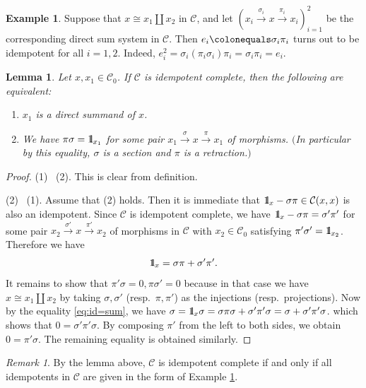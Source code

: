 \documentclass{surv-l}
\numberwithin{equation}{chapter}
\numberwithin{figure}{chapter}
\theoremstyle{plain}
\newtheorem{lem}[thm]{Lemma}
\theoremstyle{definition}
\newtheorem{exm}[thm]{Example}
\theoremstyle{remark}
\newtheorem{rmk}[thm]{Remark}
\newcommand{\id}{1\kern-.25em{\text{{\rm l}}}}
\begin{document}
\begin{exm}\label{exm:split-idemp-from-decomp}
Suppose that $x \cong x_1 \amalg x_2$ in ${\mathcal{C}}$, and let
$(x_i \xrightarrow{\sigma_i} x \xrightarrow{\pi_i} x_i)_{i=1}^2$ be the corresponding direct sum system
in ${\mathcal{C}}$.
Then $e_i\colonequals  \sigma_i \pi_i$ turns out to be idempotent for all $i=1,2$.
Indeed, $e_i^2 = \sigma_i (\pi_i\sigma_i) \pi_i = \sigma_i \pi_i = e_i$.
\end{exm}

\begin{lem}\label{lem:2.5.19}
Let $x, x_1 \in {\mathcal{C}}_0$.
If ${\mathcal{C}}$ is idempotent complete, then the following are equivalent:
\begin{enumerate}
\item
$x_1$ is a direct summand of $x$.
\item
We have $\pi\sigma = \id _{x_1}$ for some pair $x_1 \xrightarrow{\sigma} x \xrightarrow{\pi} x_1$
of morphisms.
$($In particular by this equality, $\sigma$ is a section and
$\pi$ is a retraction.$)$
\end{enumerate}
\end{lem}

\begin{proof}
(1) \text{$\Rightarrow$}\  (2).
This is clear from definition.

(2) \text{$\Rightarrow$}\  (1).
Assume that (2) holds.
Then it is immediate that $\id_x - \sigma\pi \in {\mathcal{C}}(x,x)$ is also an idempotent.
Since ${\mathcal{C}}$ is idempotent complete,
we have $\id_x - \sigma\pi = \sigma'\pi'$ for some pair $x_2 \xrightarrow{\sigma'} x \xrightarrow{\pi'} x_2$
of morphisms in ${\mathcal{C}}$ with $x_2 \in {\mathcal{C}}_0$ satisfying
$\pi'\sigma' = \id_{x_2}$.
Therefore we have
\begin{equation}\label{eq:id=sum}
\id_x = \sigma\pi + \sigma'\pi'.
\end{equation}
It remains to show that $\pi'\sigma=0, \pi\sigma' = 0$
because in that case we have $x \cong x_1 \amalg x_2$
by taking $\sigma, \sigma'$ (resp.\ $\pi, \pi'$) as the injections (resp.\ projections).
Now by the equality \eqref{eq:id=sum}, we have
$\sigma= \id_x \sigma = \sigma\pi\sigma + \sigma'\pi'\sigma = \sigma + \sigma'\pi'\sigma$.
which shows that $0 = \sigma'\pi'\sigma$.
By composing $\pi'$ from the left to both sides, we obtain
$0 =\pi'\sigma$.  The remaining equality is obtained similarly.
\end{proof}

\begin{rmk}
By the lemma above,
${\mathcal{C}}$ is idempotent complete if and only if
all idempotents in ${\mathcal{C}}$ are given in the form of
Example \ref{exm:split-idemp-from-decomp}.
\end{rmk}
\end{document}
